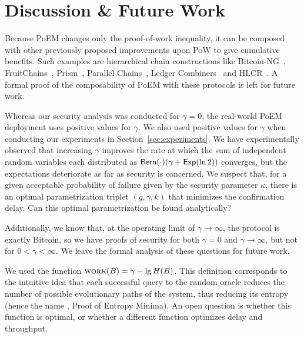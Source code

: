 \section{Discussion \& Future Work}

\noindent
\myparagraph[Composability]
Because PoEM changes only the proof-of-work inequality, it can be composed with other
previously proposed improvements upon PoW to give cumulative benefits.
Such examples are hierarchical chain constructions like
Bitcoin-NG~\cite{bitcoinng}, Fruit\-Chains~\cite{fruitchains},
Prism~\cite{prism}, Parallel Chains~\cite{parallel-chains},
Ledger Combiners~\cite{ledger-combiners} and HLCR~\cite{hlcr}.
A formal proof of the composability of PoEM with these protocols is left for future work.

\noindent
\myparagraph[Bias]
Whereas our security analysis was conducted for $\gamma = 0$,
the real-world PoEM deployment uses positive values for $\gamma$.
We also used positive values for $\gamma$ when conducting our experiments
in Section~\ref{sec:experiments}. We have experimentally observed that
increasing $\gamma$ improves the rate at which the
sum of independent random variables each distributed as $\textsf{Bern}(\cdot) (\gamma + \textsf{Exp}(\ln2))$
converges, but the expectations deteriorate as far as security is concerned.
We suspect that, for a given acceptable probability of failure given by the security
parameter $\kappa$, there is an optimal parametrization triplet $(g, \gamma, k)$ that
minimizes the confirmation delay. Can this optimal parametrization be found analytically?

Additionally,
we know that, at the operating limit of $\gamma \to \infty$, the protocol
is exactly Bitcoin, so we have proofs of security for both
$\gamma = 0$ and $\gamma \to \infty$, but not for $0 < \gamma < \infty$.
We leave the formal analysis of these questions for future work.

\noindent
{}
We used the function $\textsc{work}(B) = \gamma - \lg H(B)$.
This definition corresponds to the intuitive idea that
each successful query to the random oracle reduces the number of possible evolutionary
paths of the system, thus reducing its entropy
(hence the name \emph{\poem}, Proof of Entropy Minima).
An open question
is whether this function is optimal, or whether
a different function optimizes delay and throughput.

